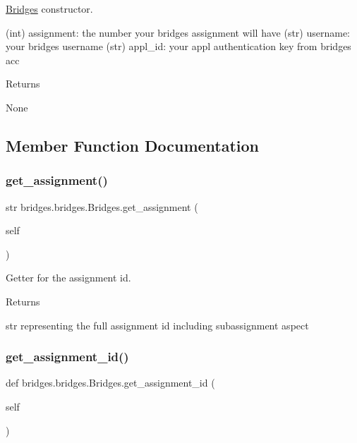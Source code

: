 \mbox{\hyperlink{classbridges_1_1bridges_1_1_bridges}{Bridges}} constructor. 

\begin{DoxyVerb}       (int) assignment: the number your bridges assignment will have
       (str) username: your bridges username
       (str) appl_id: your appl authentication key from bridges acc
\end{DoxyVerb}
 \begin{DoxyReturn}{Returns}


None 
\end{DoxyReturn}


\subsection{Member Function Documentation}
\mbox{\label{classbridges_1_1bridges_1_1_bridges_ae74fd60689c1cb3088c80e6097d14e73}} 
\subsubsection{\texorpdfstring{get\_assignment()}{get\_assignment()}}
{\footnotesize\ttfamily  str bridges.\+bridges.\+Bridges.\+get\+\_\+assignment (\begin{DoxyParamCaption}\item[{}]{self }\end{DoxyParamCaption})}



Getter for the assignment id. 

\begin{DoxyReturn}{Returns}


str representing the full assignment id including subassignment aspect 
\end{DoxyReturn}
\mbox{\label{classbridges_1_1bridges_1_1_bridges_a94f39f11368031ad33800aac0bac2f7d}} 
\subsubsection{\texorpdfstring{get\_assignment\_id()}{get\_assignment\_id()}}
{\footnotesize\ttfamily def bridges.\+bridges.\+Bridges.\+get\+\_\+assignment\+\_\+id (\begin{DoxyParamCaption}\item[{}]{self }\end{DoxyParamCaption})}



